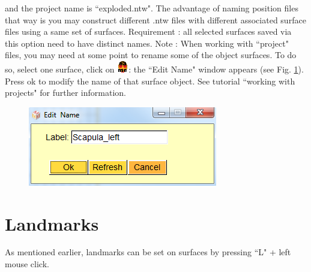 \noindent and the project name is ``exploded.ntw". The advantage of naming position files that way is you may construct different .ntw files with different associated surface files using a same set of surfaces. Requirement : all selected surfaces saved via this option
need to have distinct names. Note : When working with ``project" files, you may need at
some point to rename some of the object surfaces. To do so, select one surface, click on \includegraphics[scale=0.7]{images/pixmap/name.png}: the ``Edit Name" window appears (see Fig. \ref{edit_object_name_window}).
Press ok to modify the name of that surface object. See tutorial ``working with projects" for further information.

\begin{figure}
  \centering  
 \includegraphics[scale=0.5]{images/Icons/edit_name.png}
\label{edit_object_name_window}
\end{figure}




\section{Landmarks}
As mentioned earlier, landmarks can be set on surfaces by pressing ``L" + left mouse click.\\

